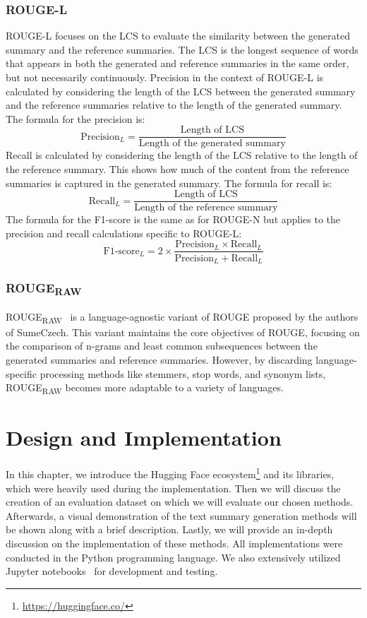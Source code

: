\documentclass[english, ba, kiv, he, iso690numb, pdf, viewonly]{fasthesis}
\begin{document}
	\subsection{ROUGE-L}
	ROUGE-L focuses on the LCS to evaluate the similarity between the generated summary and the reference summaries. The LCS is the longest sequence of words that appears in both the generated and reference summaries in the same order, but not necessarily continuously. 
	Precision in the context of ROUGE-L is calculated by considering the length of the LCS between the generated summary and the reference summaries relative to the length of the generated summary. The formula for the precision is:
	$$
	\text{Precision}_{L} = \frac{\text{Length of LCS}}{\text{Length of the generated summary}}
	$$
	Recall is calculated by considering the length of the LCS relative to the length of the reference summary. This shows how much of the content from the reference summaries is captured in the generated summary. The formula for recall is:
	$$
	\text{Recall}_{L} = \frac{\text{Length of LCS}}{\text{Length of the reference summary}}
	$$
	The formula for the F1-score is the same as for ROUGE-N but applies to the precision and recall calculations specific to ROUGE-L:
	$$
	\text{F1-score}_{L} = 2 \times \frac{\text{Precision}_{L} \times \text{Recall}_{L}}{\text{Precision}_{L} + \text{Recall}_{L}}
	$$
	\subsection{ROUGE\textsubscript{RAW}}
	ROUGE\textsubscript{RAW}~\cite{straka-etal-2018-sumeczech} is a language-agnostic variant of ROUGE proposed by the authors of SumeCzech. This variant maintains the core objectives of ROUGE, focusing on the comparison of n-grams and least common subsequences between the generated summaries and reference summaries. However, by discarding language-specific processing methods like stemmers, stop words, and synonym lists, ROUGE\textsubscript{RAW} becomes more adaptable to a variety of languages.
	
	\chapter{Design and Implementation} \label{char:implementation}
	In this chapter, we introduce the Hugging Face ecosystem\footnote{\url{https://huggingface.co/}} and its libraries, which were heavily used during the implementation. Then we will discuss the creation of an evaluation dataset on which we will evaluate our chosen methods. Afterwards, a visual demonstration of the text summary generation methods will be shown along with a brief description. Lastly, we will provide an in-depth discussion on the implementation of these methods. All implementations were conducted in the Python programming language. We also extensively utilized Jupyter notebooks~\cite{Kluyver2016jupyter} for development and testing.
\end{document}

